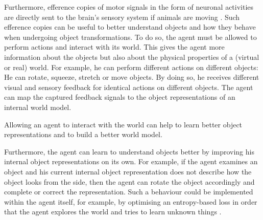 Furthermore, efference copies of motor signals in the form of neuronal activities are directly sent to the brain’s sensory system if animals are moving .
Such efference copies can be useful to better understand objects and how they behave when undergoing object transformations.
To do so, the agent must be allowed to perform actions and interact with its world.
This gives the agent more information about the objects but also about the physical properties of a (virtual or real) world. For example, he can perform different actions on different objects: He can rotate, squeeze, stretch or move objects. By doing so, he receives different visual and sensory feedback for identical actions on different objects.
The agent can map the captured feedback signals to the object representations of an internal world model.

\begin{claim}
	Allowing an agent to interact with the world can help to learn better object representations and to build a better world model.
\end{claim}

Furthermore, the agent can learn to understand objects better by improving his internal object representations on its own. For example, if the agent examines an object and his current internal object representation does not describe how the object looks from the side, then the agent can rotate the object accordingly and complete or correct the representation. 
Such a behaviour could be implemented within the agent itself, for example, by optimising an entropy-based loss in order that the agent explores the world and tries to learn unknown things .














